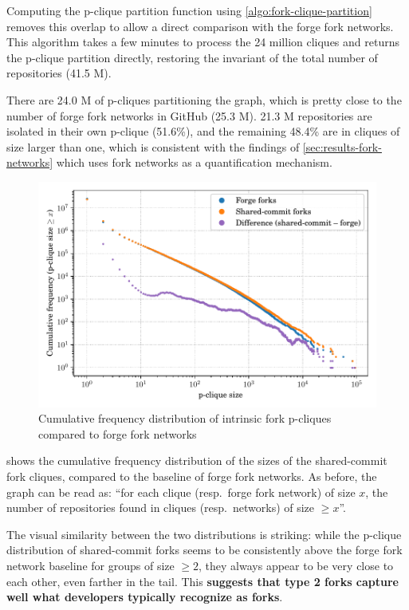 Computing the p-clique partition function using
\cref{algo:fork-clique-partition} removes this overlap to allow a direct
comparison with the forge fork networks. This algorithm takes a few minutes to
process the 24 million cliques and returns the p-clique partition directly,
restoring the invariant of the total number of repositories (41.5 M).

There are 24.0 M of p-cliques partitioning the graph, which is pretty close to
the number of forge fork networks in GitHub (25.3 M).
21.3 M repositories are isolated in their own p-clique (51.6\%), and the
remaining 48.4\% are in cliques of size larger than one, which is consistent
with the findings of \cref{sec:results-fork-networks} which uses fork
networks as a quantification mechanism.

\begin{figure}[t]
    \centering
    \includegraphics[width=0.8\linewidth]{img/forks/fork-clique-partition-freq-distribution.pdf}
    \caption{Cumulative frequency distribution of intrinsic fork p-cliques
    compared to forge fork networks}%
    \label{fig:fork-clique-freq-distrib}
\end{figure}

 shows the cumulative frequency
distribution of the sizes of the shared-commit fork cliques, compared to the
baseline of forge fork networks. As before, the graph can be read as: ``for
each clique (resp.\ forge fork network) of size $x$, the number
of repositories found in cliques (resp.\ networks) of size $\geq x$''.

The visual similarity between the two distributions is striking: while the
p-clique distribution of shared-commit forks seems to be consistently above the
forge fork network baseline for groups of size $\geq 2$, they always appear to
be very close to each other, even farther in the tail. This \textbf{suggests
that type 2 forks capture well what developers typically recognize as forks}.

